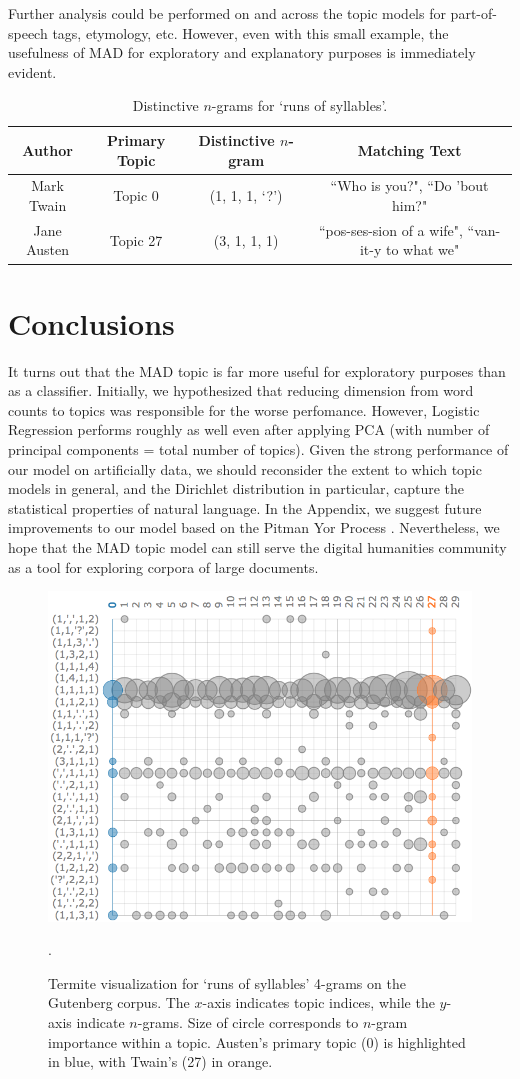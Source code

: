 \documentclass[14pt]{article} %
\theoremstyle{plain}
\theoremstyle{definition}
\theoremstyle{remark}
\begin{document}
Further analysis could be performed on and across the topic models for part-of-speech tags, etymology, etc. However, even with this small example, the usefulness of MAD for exploratory and explanatory purposes is immediately evident.

\begin{table}[ht] 
\centering
\begin{tabular}{ c | c | c | c }
  Author & Primary Topic & Distinctive $n$-gram & Matching Text \\
  \hline
  Mark Twain & Topic 0 & (1, 1, 1, `?') & ``Who is you?", ``Do 'bout him?" \\
  Jane Austen & Topic 27 & (3, 1, 1, 1) & ``pos-ses-sion of a wife", ``van-it-y to what we" \\
\end{tabular}
\caption{Distinctive $n$-grams for `runs of syllables'.}
\label{tab:distinctive_ngrams}
\end{table}

\section{Conclusions}
 It turns out that the MAD topic is far more useful for exploratory purposes than as a classifier. Initially, we hypothesized that reducing dimension from word counts to topics was responsible for the worse perfomance. However, Logistic Regression performs roughly as well even after applying PCA (with number of principal components = total number of topics). Given the strong performance of our model on artificially data, we should reconsider the extent to which topic models in general, and the Dirichlet distribution in particular, capture the statistical properties of natural language. In the Appendix, we suggest future improvements to our model based on the Pitman Yor Process \cite{teh2006hierarchical}. Nevertheless, we hope that the MAD topic model can still serve the digital humanities community as a tool for exploring corpora of large documents.

\newpage


\begin{figure}
\centering
\includegraphics[width=0.5\linewidth]{termite.png}
\caption{Termite visualization for `runs of syllables' 4-grams on the Gutenberg corpus. The $x$-axis indicates topic indices, while the $y$-axis indicate $n$-grams. Size of circle corresponds to $n$-gram importance within a topic. Austen's primary topic (0) is highlighted in blue, with Twain's (27) in orange.}
\label{fig:termite}.
\end{figure}
\end{document}
